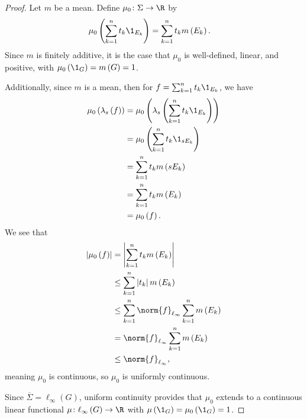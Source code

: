 \documentclass[10pt]{mypackage2}
\begin{document}
\begin{proof}
  Let $m$ be a mean. Define $\mu_0\colon \Sigma\rightarrow \R$ by
  \begin{align*}
    \mu_0\left(\sum_{k=1}^{n}t_k\1_{E_k}\right) &= \sum_{k=1}^{n}t_km\left(E_k\right).
  \end{align*}
  Since $m$ is finitely additive, it is the case that $\mu_0$ is well-defined, linear, and positive, with $\mu_0\left(\1_{G}\right) = m\left(G\right) = 1$.\newline

  Additionally, since $m$ is a mean, then for $f = \sum_{k=1}^{n}t_k\1_{E_k}$, we have
  \begin{align*}
    \mu_0\left(\lambda_s\left(f\right)\right) &= \mu_0\left(\lambda_s\left(\sum_{k=1}^{n}t_k\1_{E_k}\right)\right)\\
                                              &= \mu_0\left(\sum_{k=1}^{n}t_k\1_{sE_k}\right)\\
                                              &= \sum_{k=1}^{n}t_km\left(sE_k\right)\\
                                              &= \sum_{k=1}^{n}t_km\left(E_k\right)\\
                                              &= \mu_0\left(f\right).
  \end{align*}
  We see that
  \begin{align*}
    \left\vert \mu_0\left(f\right) \right\vert &= \left\vert \sum_{k=1}^{n}t_km\left(E_k\right) \right\vert\\
                                               &\leq \sum_{k=1}^{n}\left\vert t_k \right\vert m\left(E_k\right)\\
                                               &\leq \sum_{k=1}^{n}\norm{f}_{\ell_{\infty}}\sum_{k=1}^{n}m\left(E_k\right)\\
                                               &= \norm{f}_{\ell_{\infty}}\sum_{k=1}^{n}m\left(E_k\right)\\
                                               &\leq \norm{f}_{\ell_{\infty}},
  \end{align*}
  meaning $\mu_0$ is continuous, so $\mu_0$ is uniformly continuous.\newline

  Since $\overline{\Sigma} = \ell_{\infty}\left(G\right)$, uniform continuity provides that $\mu_0$ extends to a continuous linear functional $\mu\colon \ell_{\infty}\left(G\right)\rightarrow \R$ with $\mu\left(\1_{G}\right) = \mu_0\left(\1_{G}\right) = 1$.\newline


\end{proof}
\end{document}
